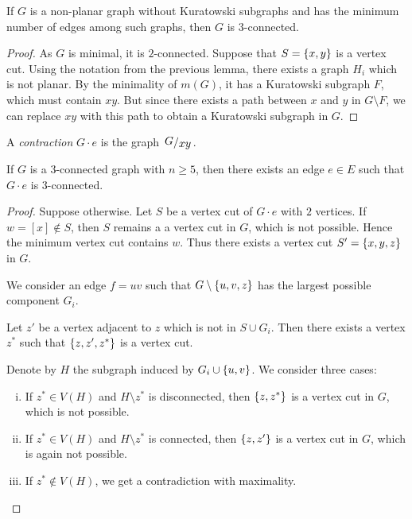 \begin{lema}
If $G$ is a non-planar graph without Kuratowski subgraphs and has
the minimum number of edges among such graphs, then $G$ is
$3$-connected.
\end{lema}

\begin{proof}
As $G$ is minimal, it is $2$-connected. Suppose that
$S = \left\{x,y\right\}$ is a vertex cut. Using the notation from the
previous lemma, there exists a graph $H_i$ which is not planar. By
the minimality of $m(G)$, it has a Kuratowski subgraph $F$, which
must contain $xy$. But since there exists a path between $x$ and
$y$ in $G \setminus F$, we can replace $xy$ with this path to
obtain a Kuratowski subgraph in $G$.
\end{proof}

\begin{definicija}
A \emph{contraction} $G \cdot e$ is the graph $\kvoc{G}{xy}$.
\end{definicija}

\begin{izrek}
If $G$ is a $3$-connected graph with $n \geq 5$, then there exists
an edge $e \in E$ such that $G \cdot e$ is $3$-connected.
\end{izrek}

\begin{proof}
Suppose otherwise. Let $S$ be a vertex cut of $G \cdot e$ with $2$
vertices. If $w = [x] \not \in S$, then $S$ remains a a vertex cut
in $G$, which is not possible. Hence the minimum vertex cut
contains $w$. Thus there exists a vertex cut $S' = \left\{x,y,z\right\}$ in
$G$.

We consider an edge $f = uv$ such that $G \setminus \left\{u,v,z\right\}$
has the largest possible component $G_i$.

Let $z'$ be a vertex adjacent to $z$ which is not in $S \cup G_i$.
Then there exists a vertex $z^*$ such that $\left\{z, z', z^*\right\}$ is a
vertex cut.

Denote by $H$ the subgraph induced by $G_i \cup \left\{u,v\right\}$. We
consider three cases:

\begin{enumerate}[i)]
\item If $z^* \in V(H)$ and $H \setminus z^*$ is disconnected, then
$\left\{z, z^*\right\}$ is a vertex cut in $G$, which is not possible.
\item If $z^* \in V(H)$ and $H \setminus z^*$ is connected, then
$\left\{z, z'\right\}$ is a vertex cut in $G$, which is again not possible.
\item If $z^* \not \in V(H)$, we get a contradiction with
maximality. \qedhere
\end{enumerate}
\end{proof}

